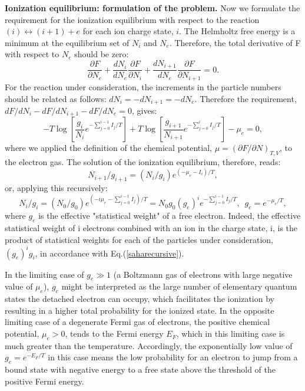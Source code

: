 {\bf Ionization equilibrium: formulation of the problem.} Now we formulate the requirement for the
ionization equilibrium with respect to the reaction $(i)\leftrightarrow(i+1)+e$ for each ion charge state, $i$.
The Helmholtz free energy is a minimum at the equilibrium set of $N_i$ and $N_e$. Therefore, the total
derivative of F with respect to $N_e$ should be zero:
\begin{equation}
\frac{\partial F}{\partial N_e} + \frac{d N_i}{d N_e} \frac{\partial F}{\partial N_i} +
\frac{d N_{i+1}}{d N_e} \frac{\partial F}{\partial N_{i+1}} = 0.
\end{equation}
For the reaction under
consideration, the increments in the particle numbers should be 
related as follows: $dN_{i}=-dN_{i+1}=-dN_e$.
Therefore the requirement, $dF/dN_{i}-dF/dN_{i+1}-dF/dN_e=0$, gives:
\begin{equation}\label{equili}
-T\log\left[\frac{g_{i}}{N_{i}} e^{-\sum_{j=0}^{i-1}I_j/T}\right] + T\log\left[\frac{g_{i+1}}{N_{i+1}} e^{-\sum_{j=0}^{i}I_j/T}\right]-\mu_e=0,
\end{equation}
where we applied the definition of the chemical potential, $\mu=(\partial F/\partial N)_{T,V}$, to the electron gas.
The solution of the ionization equilibrium, therefore, reads:
\begin{equation}
N_{i+1}/g_{i+1}=(N_i/g_i)e^{(-\mu_e-I_i)/T},
\end{equation}
or, applying this recursively:
\begin{equation}\label{saharecursive}
N_{i}/g_{i}=(N_0/g_0)e^{(-i\mu_e-\sum_{j=0}^{i-1}I_j)/T}=N_0g_0(g_e)^ie^{-\sum_{j=0}^{i-1}I_j/T},\,\,\,g_e=e^{-\mu_e/T},
\end{equation}
where $g_e$ is the effective "statistical weight" of a free electron.
Indeed, the effective statistical weight of i electrons combined with an ion in the charge state, i, is the
product of statistical weights for each of the particles under consideration, $(g_e)^i g_i$, in accordance with Eq.(\ref{saharecursive}).

In the limiting case of $g_e\gg1$ 
(a Boltzmann gas of electrons with large negative value of $\mu_e$), $g_e$ might be interpreted as the
large number of elementary quantum states the detached electron can occupy, which facilitates the ionization by resulting in a higher total probability for 
the ionized state. In the opposite limiting case of a degenerate Fermi gas of electrons, the positive chemical potential, $\mu_e>0$, 
tends to the Fermi energy $E_F$, which in
this limiting case is much greater than the temperature. Accordingly, the exponentially low value of $g_e=e^{-E_F/T}$ in this case means the low 
probability for an electron to jump from a bound state with negative energy to a free state above the threshold of the positive Fermi energy.  

